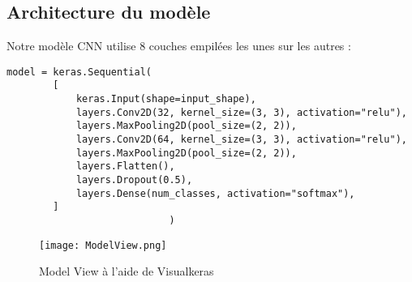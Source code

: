 \subsection{Architecture du modèle}
Notre modèle CNN utilise 8 couches empilées les unes sur les autres :

\begin{lstlisting}
model = keras.Sequential(
        [
            keras.Input(shape=input_shape),
            layers.Conv2D(32, kernel_size=(3, 3), activation="relu"),
            layers.MaxPooling2D(pool_size=(2, 2)),
            layers.Conv2D(64, kernel_size=(3, 3), activation="relu"),
            layers.MaxPooling2D(pool_size=(2, 2)),
            layers.Flatten(),
            layers.Dropout(0.5),
            layers.Dense(num_classes, activation="softmax"),
        ]
                            )
\end{lstlisting}
\begin{figure}[!h]
  \centering
  \texttt{[image: ModelView.png]}
  \caption{ Model View à l'aide de Visualkeras}
  \label{fig:Model View à l'aide de Visualkeras}
\end{figure}

